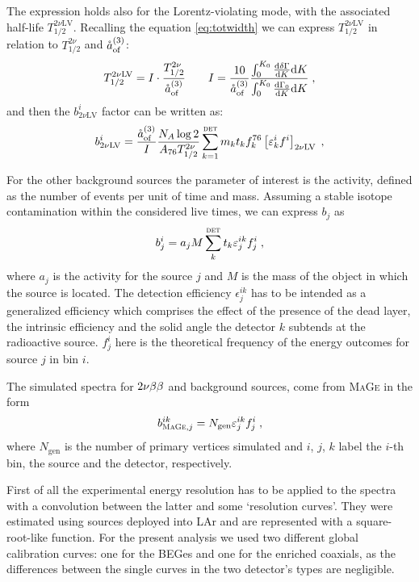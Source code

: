 The expression holds also for the Lorentz-violating mode, with the associated half-life $T_{1/2}^{2\nu\text{LV}}$. Recalling the equation \ref{eq:totwidth} we can express $T_{1/2}^{2\nu\text{LV}}$ in relation to $T_{1/2}^{2\nu}$ and $\aof$:
\[T_{1/2}^{2\nu\text{LV}}=I\cdot\frac{T_{1/2}^{2\nu}}{\aof}\qquad I=\frac{10}{\aof}\frac{\int_0^{K_0}\frac{\text{d}\delta\Gamma}{\text{d}K}\text{d}K}{\int_0^{K_0}\frac{\text{d}\Gamma_0}{\text{d}K}\text{d}K}\;,\]
and then the $b_{2\nu\text{LV}}^i$ factor can be written as:
\[b_{2\nu\text{LV}}^i=\frac{\aof}{I}\frac{N_A\log2}{A_{76}T_{1/2}^{2\nu}}\sum_{k=1}^\textsc{det}m_kt_kf^{76}_k\left[\epsilon^i_kf^i\right]_{2\nu\text{LV}}\;,\]

 For the other background sources the parameter of interest is the activity, defined as the number of events per unit of time and mass. Assuming a stable isotope contamination within the considered live times, we can express $b_j$ as
\[b_j^i=a_jM\sum_k^\textsc{det}t_k\epsilon_j^{ik}f_j^i\;,\label{eq:extsources}\]
where $a_j$ is the activity for the source $j$ and $M$ is the mass of the object in which the source is located. The detection efficiency $\epsilon_j^{ik}$ has to be intended as a generalized efficiency which comprises the effect of the presence of the dead layer, the intrinsic efficiency and the solid angle the detector $k$ subtends at the radioactive source. $f_j^i$ here is the theoretical frequency of the energy outcomes for source $j$ in bin $i$.

 The simulated spectra for $2\nbb$ and background sources, come from \textsc{MaGe} in the form
\[b^{ik}_{\textsc{MaGe},j}=N_\text{gen}\epsilon^{ik}_jf_j^i\;,\]
where $N_\text{gen}$ is the number of primary vertices simulated and $i$, $j$, $k$ label the $i$-th bin, the source and the detector, respectively.

First of all the experimental energy resolution has to be applied to the spectra with a convolution between the latter and some `resolution curves'. They were estimated using  sources deployed into LAr and are represented with a square-root-like function. For the present analysis we used two different global calibration curves: one for the BEGes and one for the enriched coaxials, as the differences between the single curves in the two detector's types are negligible.

